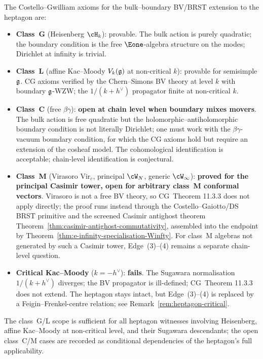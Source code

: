 \begin{remark}
\label{rem:edge-34-scope}%
The Costello--Gwilliam axioms for the bulk--boundary BV/BRST
extension to the heptagon are:
\begin{itemize}
\item \textbf{Class~G} (Heisenberg $\cH_k$): provable. The bulk
action is purely quadratic; the boundary condition is the free
$\Eone$-algebra structure on the modes; Dirichlet at infinity is
trivial.
\item \textbf{Class~L} (affine Kac--Moody $V_k(\mathfrak{g})$ at non-critical
$k$): provable for semisimple $\mathfrak{g}$. CG axioms verified by the
Chern--Simons BV theory at level $k$ with boundary $\mathfrak{g}$-WZW; the
$1/(k+h^\vee)$ propagator finite at non-critical $k$.
\item \textbf{Class~C} (free $\beta\gamma$): \textbf{open at chain level
when boundary mixes movers}. The bulk action is free quadratic but the
holomorphic--antiholomorphic boundary condition is not literally
Dirichlet; one must work with the $\beta\gamma$-vacuum boundary
condition, for which the CG axioms hold but require an extension of
the cosheaf model. The cohomological identification is acceptable;
chain-level identification is conjectural.
\item \textbf{Class~M} (Virasoro $\mathrm{Vir}_c$, principal $\cW_N$,
generic $\cW_\infty$): \textbf{proved for the principal Casimir tower,
open for arbitrary class~M conformal vectors}. Virasoro is not a free
BV theory, so CG~Theorem 11.3.3 does not apply directly; the proof runs
instead through the Costello--Gaiotto/DS BRST primitive and the screened
Casimir antighost theorem
Theorem~\ref{thm:casimir-antighost-commutativity}, assembled into the
endpoint by Theorem~\ref{thm:e-infinity-specialisation-Winfty}. For class~M
algebras not generated by such a Casimir tower, Edge~(3)--(4) remains a
separate chain-level question.
\item \textbf{Critical Kac--Moody} ($k=-h^\vee$): \textbf{fails}. The
Sugawara normalisation $1/(k+h^\vee)$ diverges; the BV propagator is
ill-defined; CG~Theorem 11.3.3 does not extend. The heptagon stays
intact, but Edge~(3)--(4) is replaced by a Feigin--Frenkel-centre
relation; see Remark~\ref{rem:heptagon-critical}.
\end{itemize}
The class~G/L scope is sufficient for all heptagon witnesses
involving Heisenberg, affine Kac--Moody at non-critical level, and
their Sugawara descendants; the open class~C/M cases are recorded as
conditional dependencies of the heptagon's full applicability.
\end{remark}

